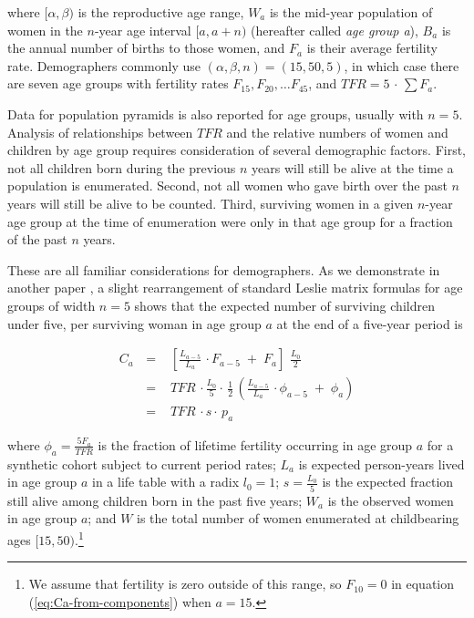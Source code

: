 \documentclass[12pt]{article}
\begin{document}
\noindent where \([\alpha,\beta)\) is the reproductive age range,
\(W_a\) is the mid-year population of women in the \(n\)-year age
interval \([a,a+n)\) (hereafter called \textit{age group a}), \(B_a\) is
the annual number of births to those women, and \(F_a\) is their average
fertility rate. Demographers commonly use
\((\alpha,\beta,n)=(15,50,5)\), in which case there are seven age groups
with fertility rates \(F_{15},F_{20},\ldots F_{45}\), and
\(TFR=5\,\cdot\,\sum F_a\).

Data for population pyramids is also reported for age groups, usually
with \(n=5\). Analysis of relationships between \(TFR\) and the relative
numbers of women and children by age group requires consideration of
several demographic factors. First, not all children born during the
previous \(n\) years will still be alive at the time a population is
enumerated. Second, not all women who gave birth over the past \(n\)
years will still be alive to be counted. Third, surviving women in a
given \(n\)-year age group at the time of enumeration were only in that
age group for a fraction of the past \(n\) years.

These are all familiar considerations for demographers. As we
demonstrate in another paper \citep{schmertmann2019bayesian}, a slight
rearrangement of standard Leslie matrix formulas
\cite[e.g.~][]{wachter2014essential} for age groups of width \(n=5\)
shows that the expected number of surviving children under five, per
surviving woman in age group \(a\) at the end of a five-year period is

\begin{eqnarray}
\label{eq:Ca-from-components}
C_{a}\, & = & \,\,\left[\frac{L_{a-5}}{L_{a}}\,\cdot F_{a-5}\;+\; F_{a}\right]\,\,\frac{L_{0}}{2}\label{eq:Ca}\\
 & = & \,\, TFR\,\cdot\frac{L_{0}}{5}\cdot\,\frac{1}{2}\,\left(\frac{L_{a-5}}{L_{a}}\,\cdot\phi_{a-5}\;+\;\phi_{a}\right)\nonumber \\
 & = & \,\, TFR\,\cdot s\cdot\, p_{a}\nonumber
\end{eqnarray}

\noindent where \(\phi_a = \tfrac{5 F_a}{TFR}\) is the fraction of
lifetime fertility occurring in age group \(a\) for a synthetic cohort
subject to current period rates; \(L_a\) is expected person-years lived
in age group \(a\) in a life table with a radix \(l_0=1\);
\(s=\tfrac{L_0}{5}\) is the expected fraction still alive among children
born in the past five years; \(W_a\) is the observed women in age group
\(a\); and \(W\) is the total number of women enumerated at childbearing
ages
\([15, 50)\).\footnote{We assume that fertility is zero outside of this range, so $F_{10}=0$ in equation (\ref{eq:Ca-from-components}) when $a=15$.}
\end{document}
